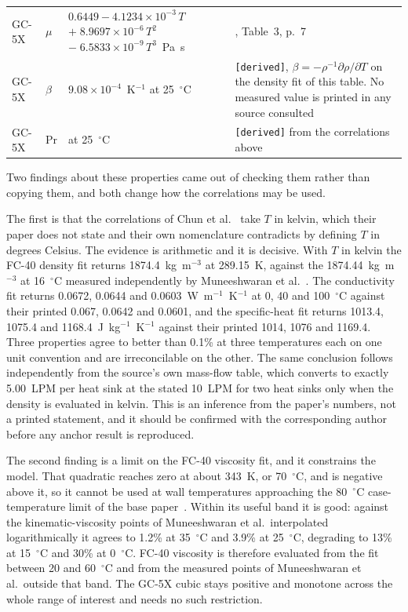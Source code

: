 \begin{table}[htbp]
\begin{tabular}{@{}l>{\raggedright\arraybackslash}p{}>{\raggedright\arraybackslash}p{}>{\raggedright\arraybackslash}p{}@{}}
GC-5X & $\mu$     & $0.6449 - 4.1234\times10^{-3}\,T$ $+\;8.9697\times10^{-6}\,T^2$ $-\;6.5833\times10^{-9}\,T^3$~Pa~s & \cite{chun2026}, Table~3, p.~7 \\
GC-5X & $\beta$   & $9.08\times10^{-4}$~K$^{-1}$ at 25~$^{\circ}$C & \texttt{[derived]}, $\beta=-\rho^{-1}\partial\rho/\partial T$ on the density fit of this table. No measured value is printed in any source consulted \\
GC-5X & $\mathrm{Pr}$ & 570 at 25~$^{\circ}$C & \texttt{[derived]} from the correlations above \\
\bottomrule
\end{tabular}
\end{table}

Two findings about these properties came out of checking them rather than copying them, and both
change how the correlations may be used.

The first is that the correlations of Chun et al.~\cite{chun2026} take $T$ in kelvin, which their
paper does not state and their own nomenclature contradicts by defining $T$ in degrees Celsius.
The evidence is arithmetic and it is decisive. With $T$ in kelvin the FC-40 density fit returns
1874.4~kg~m$^{-3}$ at 289.15~K, against the 1874.44~kg~m$^{-3}$ at 16~$^{\circ}$C measured
independently by Muneeshwaran et al.~\cite{muneeshwaran2023}. The conductivity fit returns 0.0672,
0.0644 and 0.0603~W~m$^{-1}$~K$^{-1}$ at 0, 40 and 100~$^{\circ}$C against their printed 0.067,
0.0642 and 0.0601, and the specific-heat fit returns 1013.4, 1075.4 and 1168.4~J~kg$^{-1}$~K$^{-1}$
against their printed 1014, 1076 and 1169.4. Three properties agree to better than 0.1\% at three
temperatures each on one unit convention and are irreconcilable on the other. The same conclusion
follows independently from the source's own mass-flow table, which converts to exactly 5.00~LPM per
heat sink at the stated 10~LPM for two heat sinks only when the density is evaluated in kelvin.
This is an inference from the paper's numbers, not a printed statement, and it should be confirmed
with the corresponding author before any anchor result is reproduced.

The second finding is a limit on the FC-40 viscosity fit, and it constrains the model. That
quadratic reaches zero at about 343~K, or 70~$^{\circ}$C, and is negative above it, so it cannot be
used at wall temperatures approaching the 80~$^{\circ}$C case-temperature limit of the base
paper~\cite{muneeshwaran2023}. Within its useful band it is good: against the kinematic-viscosity
points of Muneeshwaran et al.\ interpolated logarithmically it agrees to 1.2\% at 35~$^{\circ}$C
and 3.9\% at 25~$^{\circ}$C, degrading to 13\% at 15~$^{\circ}$C and 30\% at 0~$^{\circ}$C. FC-40
viscosity is therefore evaluated from the fit between 20 and 60~$^{\circ}$C and from the measured
points of Muneeshwaran et al.\ outside that band. The GC-5X cubic stays positive and monotone
across the whole range of interest and needs no such restriction.

